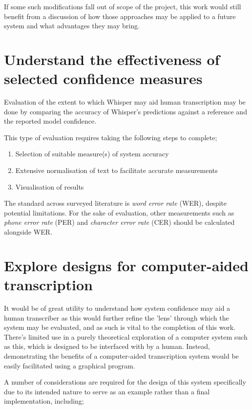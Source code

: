 If some such modifications fall out of scope of the project, this work would still benefit from a discussion of how those approaches may be applied to a future system and what advantages they may bring.

\section{Understand the effectiveness of selected confidence measures}

Evaluation of the extent to which Whisper may aid human transcription may be done by comparing the accuracy of Whisper's predictions against a reference and the reported model confidence.

This type of evaluation requires taking the following steps to complete;

\begin{enumerate}
        \item Selection of suitable measure(s) of system accuracy
        \item Extensive normalisation of text to facilitate accurate measurements
        \item Visualisation of results
\end{enumerate}

The standard across surveyed literature is \emph{word error rate} (WER), despite potential limitations.
For the sake of evaluation, other measurements such as \emph{phone error rate} (PER) and \emph{character error rate} (CER) should be calculated alongside WER.

\section{Explore designs for computer-aided transcription}

It would be of great utility to understand how system confidence may aid a human transcriber as this would further refine the 'lens' through which the system may be evaluated, and as such is vital to the completion of this work.
There's limited use in a purely theoretical exploration of a computer system such as this, which is designed to be interfaced with by a human.
Instead, demonstrating the benefits of a computer-aided transcription system would be easily facilitated using a graphical program.

A number of considerations are required for the design of this system specifically due to its intended nature to serve as an example rather than a final implementation, including;

